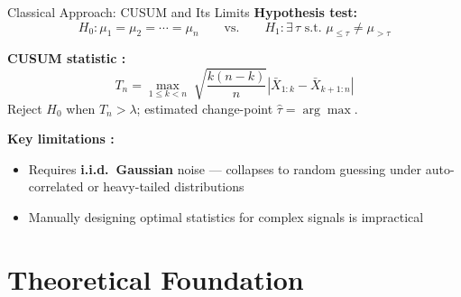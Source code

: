 \documentclass[8.5pt]{beamer}
\begin{document}
\begin{frame}{Classical Approach: CUSUM and Its Limits}
  \textbf{Hypothesis test:}
  \[
    H_0: \mu_1 = \mu_2 = \cdots = \mu_n
    \qquad\text{vs.}\qquad
    H_1: \exists\,\tau \text{ s.t. } \mu_{\le\tau} \neq \mu_{>\tau}
  \]

  \textbf{CUSUM statistic \cite{page1954cusum}:}
  \[
    T_n = \max_{1\le k < n}\;\sqrt{\frac{k(n-k)}{n}}
             \left|\bar{X}_{1:k} - \bar{X}_{k+1:n}\right|
  \]
  Reject $H_0$ when $T_n > \lambda$; estimated change-point $\hat\tau = \arg\max$.

  \bigskip
  \textbf{Key limitations \cite{li2024automatic}:}
  \begin{itemize}
    \item Requires \textbf{i.i.d.\ Gaussian} noise — collapses to random guessing under
          auto-correlated or heavy-tailed distributions
    \item Manually designing optimal statistics for complex signals is impractical
  \end{itemize}
\end{frame}

\section{Theoretical Foundation}
\end{document}
